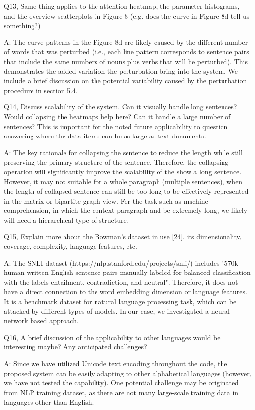 Q13, Same thing applies to the attention heatmap, the parameter histograms, and the overview scatterplots in Figure 8 (e.g. does the curve in Figure 8d tell us something?)

A: The curve patterns in the Figure 8d are likely caused by the different number of words that was perturbed (i.e., each line pattern corresponds to sentence pairs that include the same numbers of nouns plus verbs that will be perturbed). This demonstrates the added variation the perturbation bring into the system. We include a brief discussion on the potential variability caused by the perturbation procedure in section 5.4.

Q14, Discuss scalability of the system. Can it visually handle long sentences? Would collapsing the heatmaps help here? Can it handle a large number of sentences? This is important for the noted future applicability to question answering where the data items can be as large as text documents.

A: The key rationale for collapsing the sentence to reduce the length while still preserving the primary structure of the sentence. Therefore, the collapsing operation will significantly improve the scalability of the show a long sentence. However, it may not suitable for a whole paragraph (multiple sentences), when the length of collapsed sentence can still be too long to be effectively represented in the matrix or bipartite graph view. For the task such as machine comprehension, in which the context paragraph and be extremely long, we likely will need a hierarchical type of structure.

Q15, Explain more about the Bowman's dataset in use [24], its dimensionality, coverage, complexity, language features, etc.

A: The SNLI dataset (https://nlp.stanford.edu/projects/snli/) includes "570k human-written English sentence pairs manually labeled for balanced classification with the labels entailment, contradiction, and neutral". Therefore, it does not have a direct connection to the word embedding dimension or language features. It is a benchmark dataset for natural language processing task, which can be attacked by different types of models. In our case, we investigated a neural network based approach.

Q16, A brief discussion of the applicability to other languages would be interesting maybe? Any anticipated challenges?

A: Since we have utilized Unicode text encoding throughout the code, the proposed system can be easily adapting to other alphabetical languages (however, we have not tested the capability). One potential challenge may be originated from NLP training dataset, as there are not many large-scale training data in languages other than English.

